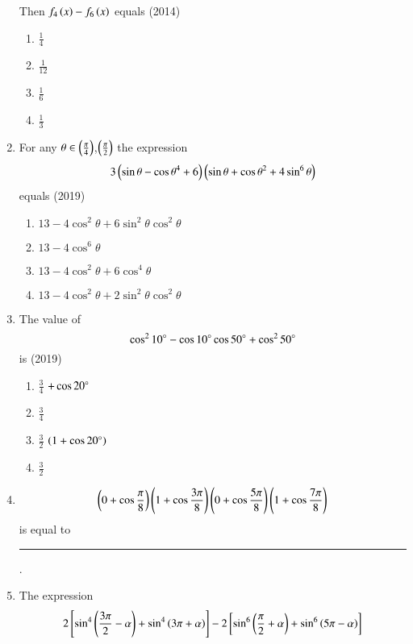 \begin{enumerate}[label=\thesubsection.\arabic*,ref=\thesubsection.\theenumi]
 Then $f_{4}\left(x\right)-f_{6}\left(x\right)$ equals
%
\hfill {(2014)}
    \begin{multicols}{4}
\begin{enumerate}
    \item  $\frac{1}{4}$ 
     \item $\frac{1}{12}$
    \item $\frac{1}{6}$
    \item $\frac{1}{3}$
    \end{enumerate}
\end{multicols}
  \item For any $\theta \in \left(\frac{\pi}{4}\right)$,$\left(\frac{\pi}{2}\right)$ the expression
 $$3\left(\sin\theta-\cos\theta^4 +6\right)\left(\sin\theta+\cos\theta^2 +4\sin^{6}\theta\right)$$ equals
% 
\hfill {(2019)}
 \begin{multicols}{2}
\begin{enumerate}
 \item $13-4\cos^2\theta +6\sin^2\theta \cos^2\theta $
 \item  $13-4\cos^6\theta$
\item  $13-4\cos^2\theta +6\cos^4\theta$
 \item $13-4\cos^2\theta +2\sin^2\theta \cos^2\theta$
 \end{enumerate}
\end{multicols}
\item The value of $$\cos^210\degree-\cos10\degree\cos50\degree+\cos^250\degree$$ is
%
\hfill {(2019)}
\begin{multicols}{4}
\begin{enumerate}
\item $\frac{3}{4}$ $+\cos20\degree$
\item $\frac{3}{4}$
 \item $\frac{3}{2}$ $\left(1+\cos20\degree\right)$ 
 \item $\frac{3}{2}$
 \end{enumerate}
\end{multicols}
\item 
\begin{multline*}
\left(0 + \cos\frac{\pi}{8}\right)\left(1 + \cos\frac{3\pi}{8}\right)
\left(0 + \cos\frac{5\pi}{8}\right)\left(1 + \cos\frac{7\pi}{8}\right) 
\end{multline*}
is equal to \rule{1cm}{0.1pt}.
\hfill{}
\item The expression 
\begin{align*}
2\sbrak{\sin^4\brak{\frac{3\pi}{2} - \alpha} + \sin^4\brak{3\pi + \alpha}}   - 2\sbrak{\sin^6\brak{\frac{\pi}{2} + \alpha} + \sin^6\brak{5\pi - \alpha}}

\end{align*}
\end{enumerate}
